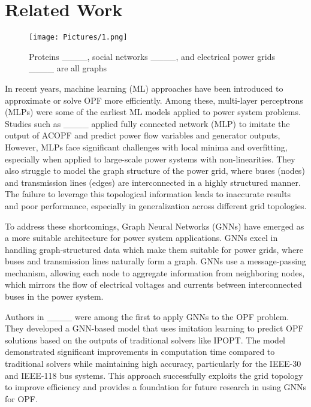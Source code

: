 \section{Related Work}
\label{gen_inst}

\begin{figure}[htbp]
  \centering
  \texttt{[image: Pictures/1.png]}
  \caption{Proteins ____, social networks ____, and electrical power grids ____ are all graphs}
  \label{fig:sample-figure}
\end{figure}

In recent years, machine learning (ML) approaches have been introduced to approximate or solve OPF more efficiently. Among these, multi-layer perceptrons (MLPs) were some of the earliest ML models applied to power system problems. Studies such as ____ applied fully connected network (MLP) to imitate the output of ACOPF and predict power flow variables and generator outputs, However, MLPs face significant challenges with local minima and overfitting, especially when applied to large-scale power systems with non-linearities. They also struggle to model the graph structure of the power grid, where buses (nodes) and transmission lines (edges) are interconnected in a highly structured manner. The failure to leverage this topological information leads to inaccurate results and poor performance, especially in generalization across different grid topologies.

To address these shortcomings, Graph Neural Networks (GNNs) have emerged as a more suitable architecture for power system applications. GNNs excel in handling graph-structured data which make them suitable for power grids, where buses and transmission lines naturally form a graph. GNNs use a message-passing mechanism, allowing each node to aggregate information from neighboring nodes, which mirrors the flow of electrical voltages and currents between interconnected buses in the power system.

Authors in ____ were among the first to apply GNNs to the OPF problem. They developed a GNN-based model that uses imitation learning to predict OPF solutions based on the outputs of traditional solvers like IPOPT. The model demonstrated significant improvements in computation time compared to traditional solvers while maintaining high accuracy, particularly for the IEEE-30 and IEEE-118 bus systems. This approach successfully exploits the grid topology to improve efficiency and provides a foundation for future research in using GNNs for OPF.

